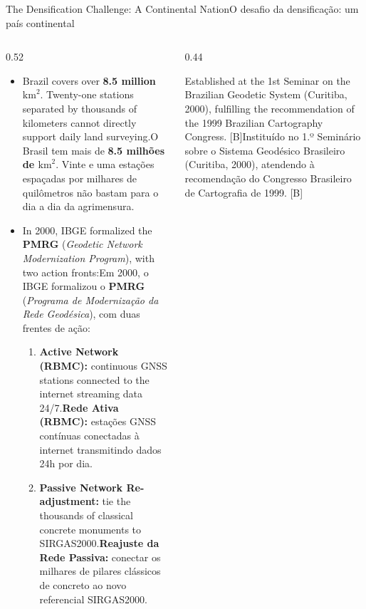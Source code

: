 \documentclass[aspectratio=169,11pt]{beamer}
\newcommand{\tr}[2]{\ifEN#2\else#1\fi}
\newcommand{\bnum}[1]{\ifmmode\textcolor{mTeal}{\mathbf{#1}}\else\textbf{\textcolor{mTeal}{#1}}\fi}
\begin{document}
\begin{frame}{\tr{O desafio da densificação: um país continental}{The Densification Challenge: A Continental Nation}}
  \begin{columns}[onlytextwidth]
    \begin{column}{0.52\textwidth}
      \begin{itemize}
        \setlength{\itemsep}{4pt}
        \scriptsize
        \item \tr{O Brasil tem mais de \bnum{\num{8.5} milhões de $\mathrm{km}^2$}. Vinte e uma
              estações espaçadas por milhares de quilômetros não bastam para o dia a dia da agrimensura.}{
              Brazil covers over \bnum{\num{8.5} million $\mathrm{km}^2$}. Twenty-one stations
              separated by thousands of kilometers cannot directly support daily land surveying.}
        \item \tr{Em 2000, o IBGE formalizou o \textbf{PMRG} (\emph{Programa de Modernização da Rede
              Geodésica}), com duas frentes de ação:}{In 2000, IBGE formalized the \textbf{PMRG}
              (\emph{Geodetic Network Modernization Program}), with two action fronts:}
              \begin{enumerate}
                \tiny
                \item \tr{\textbf{Rede Ativa (RBMC):} estações GNSS contínuas conectadas à internet transmitindo dados 24h por dia.}{\textbf{Active Network (RBMC):} continuous GNSS stations connected to the internet streaming data 24/7.}
                \item \tr{\textbf{Reajuste da Rede Passiva:} conectar os milhares de pilares clássicos de concreto ao novo referencial SIRGAS2000.}{\textbf{Passive Network Re-adjustment:} tie the thousands of classical concrete monuments to SIRGAS2000.}
              \end{enumerate}
      \end{itemize}
    \end{column}
    \begin{column}{0.44\textwidth}
      \begin{tcolorbox}[colback=mIndigo!8, colframe=mIndigo, title={\tr{O nascimento do PMRG}{Birth of PMRG}}]
        \scriptsize \tr{Instituído no 1.º Seminário sobre o Sistema Geodésico Brasileiro (Curitiba,
        2000), atendendo à recomendação do Congresso Brasileiro de Cartografia de 1999. [B]}{Established
        at the 1st Seminar on the Brazilian Geodetic System (Curitiba, 2000), fulfilling the
        recommendation of the 1999 Brazilian Cartography Congress. [B]}
      \end{tcolorbox}
    \end{column}
  \end{columns}
\end{frame}
\end{document}
